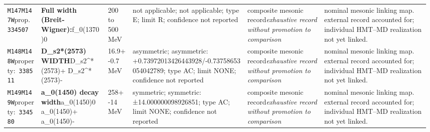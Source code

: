 \begin{landscape}
\begin{longtable}{L{1.85cm}L{4.45cm}L{2.35cm}L{4.05cm}L{3.35cm}L{7.15cm}}
\texttt{M147}\newline \texttt{M147W}\newline prop.\ \texttt{334507} & \textbf{Full width (Breit-Wigner):}\newline f\_\allowbreak{}0(1370)0 & 200 to 500\,MeV & not applicable; not applicable; type E; limit R; confidence not reported & composite mesonic record\newline \emph{exhaustive record without promotion to comparison} & nominal mesonic linking map. external record accounted for; individual HMT--MD realization not yet linked. \\
\texttt{M148}\newline \texttt{M148W}\newline property:\ \texttt{338511} & \textbf{D\_\allowbreak{}s2*(2573) WIDTH}\newline D\_\allowbreak{}s2\textasciicircum{}*(2573)+ \textbar{}\allowbreak{} D\_\allowbreak{}s2\textasciicircum{}*(2573)- & 16.9+-0.7\,MeV & asymmetric; asymmetric: +0.73972013426443928/-0.73758653054042789; type AC; limit NONE; confidence not reported & composite mesonic record\newline \emph{exhaustive record without promotion to comparison} & nominal mesonic linking map. external record accounted for; individual HMT--MD realization not yet linked. \\
\texttt{M149}\newline \texttt{M149W}\newline property:\ \texttt{334580} & \textbf{a\_\allowbreak{}0(1450) decay width}\newline a\_\allowbreak{}0(1450)0 \textbar{}\allowbreak{} a\_\allowbreak{}0(1450)+ \textbar{}\allowbreak{} a\_\allowbreak{}0(1450)- & 258+-14\,MeV & symmetric; symmetric: ±14.000000098926851; type AC; limit NONE; confidence not reported & composite mesonic record\newline \emph{exhaustive record without promotion to comparison} & nominal mesonic linking map. external record accounted for; individual HMT--MD realization not yet linked. \\

\end{longtable}
\end{landscape}
